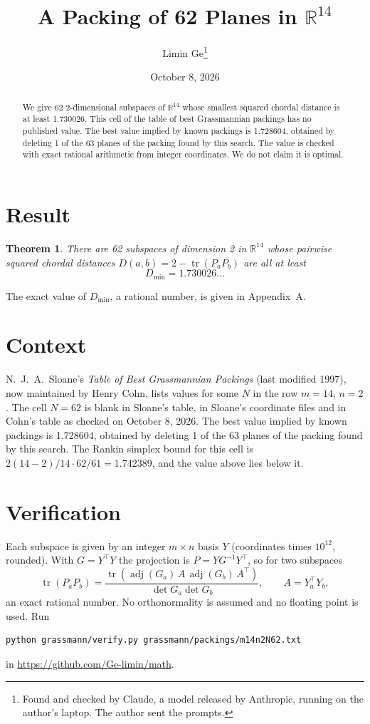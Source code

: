 \documentclass[11pt,a4paper]{article}
\title{A Packing of 62 Planes in $\mathbb{R}^{14}$}
\author{Limin Ge\thanks{Found and checked by Claude, a model released by Anthropic, running on the author's laptop. The author sent the prompts.}}
\date{October 8, 2026}
\newtheorem*{theorem}{Theorem}
\begin{document}
\maketitle
\begin{abstract}
We give 62 2-dimensional subspaces of $\mathbb{R}^{14}$ whose smallest squared chordal distance is at least 1.730026. This cell of the table of best Grassmannian packings has no published value. The best value implied by known packings is 1.728604, obtained by deleting 1 of the 63 planes of the packing found by this search. The value is checked with exact rational arithmetic from integer coordinates. We do not claim it is optimal.
\end{abstract}

\section{Result}
\begin{theorem}
There are 62 subspaces of dimension 2 in $\mathbb{R}^{14}$ whose pairwise squared chordal distances $D(a,b) = 2 - \operatorname{tr}(P_aP_b)$ are all at least
\[ D_{\min} = 1.730026\ldots \]
\end{theorem}
The exact value of $D_{\min}$, a rational number, is given in Appendix~A.


\section{Context}
N.~J.~A.~Sloane's \emph{Table of Best Grassmannian Packings} (last modified 1997), now maintained by Henry Cohn, lists values for some $N$ in the row $m=14$, $n=2$. The cell $N=62$ is blank in Sloane's table, in Sloane's coordinate files and in Cohn's table as checked on October 8, 2026. The best value implied by known packings is 1.728604, obtained by deleting 1 of the 63 planes of the packing found by this search. The Rankin simplex bound for this cell is $2(14-2)/14\cdot 62/61 = 1.742389$, and the value above lies below it.


\section{Verification}
Each subspace is given by an integer $m\times n$ basis $Y$ (coordinates times $10^{12}$, rounded). With $G=Y^\top Y$ the projection is $P=YG^{-1}Y^\top$, so for two subspaces
\[ \operatorname{tr}(P_aP_b)=\frac{\operatorname{tr}(\operatorname{adj}(G_a)\,A\,\operatorname{adj}(G_b)\,A^\top)}{\det G_a\det G_b},\qquad A=Y_a^\top Y_b, \]
an exact rational number. No orthonormality is assumed and no floating point is used. Run
\begin{verbatim}
python grassmann/verify.py grassmann/packings/m14n2N62.txt
\end{verbatim}
in \url{https://github.com/Ge-limin/math}.
\end{document}
